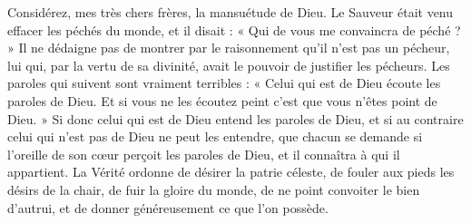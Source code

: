  Considérez, mes très chers frères, la mansuétude de Dieu. Le Sauveur était venu effacer les péchés du monde, et il disait : « Qui de vous me convaincra de péché ? » Il ne dédaigne pas de montrer par le raisonnement qu’il n’est pas un pécheur, lui qui, par la vertu de sa divinité, avait le pouvoir de justifier les pécheurs. Les paroles qui suivent sont vraiment terribles : « Celui qui est de Dieu écoute les paroles de Dieu. Et si vous ne les écoutez peint c’est que vous n’êtes point de Dieu. » Si donc celui qui est de Dieu entend les paroles de Dieu, et si au contraire celui qui n’est pas de Dieu ne peut les entendre, que chacun se demande si l’oreille de son cœur perçoit les paroles de Dieu, et il connaîtra à qui il appartient. La Vérité ordonne de désirer la patrie céleste, de fouler aux pieds les désirs de la chair, de fuir la gloire du monde, de ne point convoiter le bien d’autrui, et de donner généreusement ce que l’on possède.
